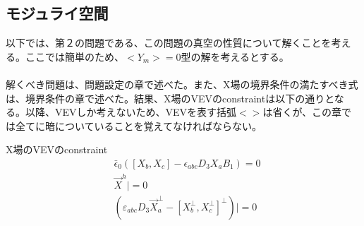 \documentclass[dvipdfmx,a4paper,10.5pt]{article}
\numberwithin{equation}{section}
\begin{document}
\subsection{モジュライ空間}
以下では、第２の問題である、この問題の真空の性質について解くことを考える。ここでは簡単のため、$<Y_{m}>=0$型の解を考えるとする。\\
\\
解くべき問題は、問題設定の章で述べた。また、X場の境界条件の満たすべき式は、境界条件の章で述べた。結果、X場のVEVのconstraintは以下の通りとなる。以降、VEVしか考えないため、VEVを表す括弧$<>$は省くが、この章では全てに暗についていることを覚えてなければならない。
\begin{resultbox}{X場のVEVのconstraint}
     \begin{align*}
    &\bar{\epsilon}_{0}([X_{b},X_{c}]-\epsilon_{abc}D_{3}X_{a}B_{1})=0\\
    &\vec{X}^{h}|=0\\
    &(\varepsilon_{abc}D_{3}\vec{X}_{a}^{\perp}-[X_{b}^{\perp},X_{c}^{\perp}]^{\perp})|=0
    \end{align*}
\end{resultbox}
\end{document}
